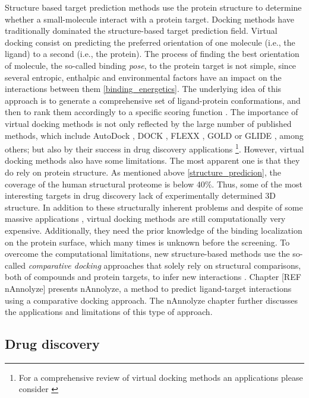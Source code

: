 \documentclass[12pt, b5paper,twoside]{tesi_upf}
\begin{document}
\par Structure based target prediction methods use the protein structure to determine whether a small-molecule interact with a protein target. Docking methods have traditionally dominated the structure-based target prediction field. Virtual docking consist on predicting the preferred orientation of one molecule (i.e., the ligand) to a second (i.e., the protein). The process of finding the best orientation of molecule, the so-called binding \textit{pose}, to the protein target is not simple, since several entropic, enthalpic and environmental factors have an impact on the interactions between them \ref{binding_energetics}. The underlying idea of this approach is to generate a comprehensive set of ligand-protein conformations, and then to rank them accordingly to a specific scoring function \cite{Alonso2006}. The importance of virtual docking methods is not only reflected by the large number of published methods, which include AutoDock \cite{Morris2009, Trott2010}, DOCK \cite{Ewing1997}, FLEXX \cite{Rarey1996}, GOLD \cite{Jones1997} or GLIDE \cite{Friesner2004}, among others; but also by their success in drug discovery applications \cite{Schames2004, Enyedy2001, Vangrevelinghe2003} \footnote{For a comprehensive review of virtual docking methods an applications please consider \cite{Kitchen2004}}. However, virtual docking methods also have some limitations. The most apparent one is that they do rely on protein structure. As mentioned above \ref{structure_predicion}, the coverage of the human structural proteome is below 40$\%$. Thus, some of the most interesting targets in drug discovery lack of experimentally determined 3D structure. In addition to these structurally inherent problems and despite of some massive applications \cite{Reardon2013}, virtual docking methods are still computationally very expensive. Additionally, they need the prior knowledge of the binding localization on the protein surface, which many times is unknown before the screening. To overcome the computational limitations, new structure-based methods use the so-called \textit{comparative docking} approaches that solely rely on structural comparisons, both of compounds and protein targets, to infer new interactions \cite{Marti-Renom2007}. Chapter [REF nAnnolyze] presents nAnnolyze, a method to predict ligand-target interactions using a comparative docking approach. The nAnnolyze chapter further discusses the applications and limitations of this type of approach. 


\subsection{Drug discovery}\label{drug_discovery}
\end{document}
